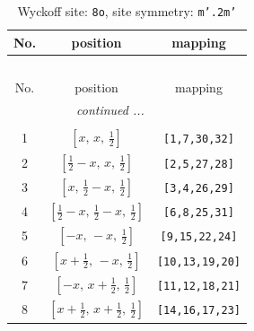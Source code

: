 \documentclass[fleqn,8pt]{jsarticle}
\begin{document}
\begin{longtable}{ccc}
\caption{Wyckoff site: {\tt 8o}, site symmetry: {\tt m'.2m'}}
 \\
 \hline \hline
No. & position & mapping \\ \hline \endfirsthead

\multicolumn{2}{l}{\tablename\ \thetable{}} \\
 \hline \hline
No. & position & mapping \\ \hline \endhead

 \hline \hline
\multicolumn{2}{r}{\footnotesize\it continued ...} \\ \endfoot

 \hline \hline
\multicolumn{2}{r}{} \\ \endlastfoot

1 & $\left[ x,\, x,\, \frac{1}{2} \right]$ & {\tt [1,7,30,32]} \\ \hline
2 & $\left[ \frac{1}{2} - x,\, x,\, \frac{1}{2} \right]$ & {\tt [2,5,27,28]} \\ \hline
3 & $\left[ x,\, \frac{1}{2} - x,\, \frac{1}{2} \right]$ & {\tt [3,4,26,29]} \\ \hline
4 & $\left[ \frac{1}{2} - x,\, \frac{1}{2} - x,\, \frac{1}{2} \right]$ & {\tt [6,8,25,31]} \\ \hline
5 & $\left[ - x,\, - x,\, \frac{1}{2} \right]$ & {\tt [9,15,22,24]} \\ \hline
6 & $\left[ x + \frac{1}{2},\, - x,\, \frac{1}{2} \right]$ & {\tt [10,13,19,20]} \\ \hline
7 & $\left[ - x,\, x + \frac{1}{2},\, \frac{1}{2} \right]$ & {\tt [11,12,18,21]} \\ \hline
8 & $\left[ x + \frac{1}{2},\, x + \frac{1}{2},\, \frac{1}{2} \right]$ & {\tt [14,16,17,23]} \\
\end{longtable}
\renewcommand{\arraystretch}{1.2}
\end{document}
